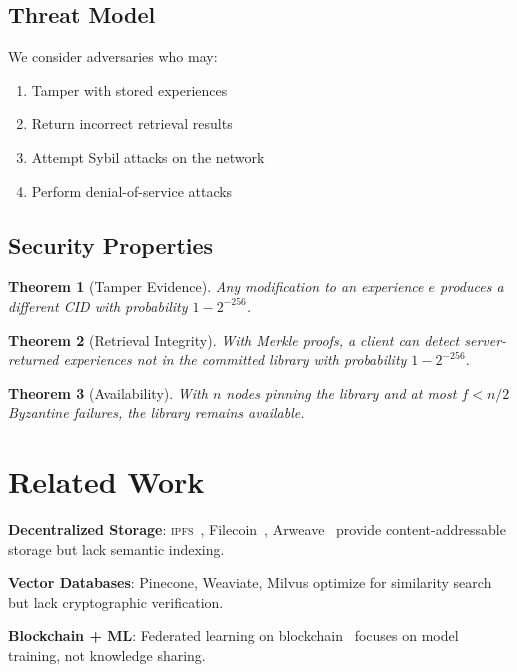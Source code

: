 \documentclass[11pt,letterpaper]{article}
\newtheorem{theorem}{Theorem}[section]
\newcommand{\IPFS}{\textsc{ipfs}}
\begin{document}
\subsection{Threat Model}

We consider adversaries who may:
\begin{enumerate}
    \item Tamper with stored experiences
    \item Return incorrect retrieval results
    \item Attempt Sybil attacks on the network
    \item Perform denial-of-service attacks
\end{enumerate}

\subsection{Security Properties}

\begin{theorem}[Tamper Evidence]
Any modification to an experience $e$ produces a different CID with probability $1 - 2^{-256}$.
\end{theorem}

\begin{theorem}[Retrieval Integrity]
With Merkle proofs, a client can detect server-returned experiences not in the committed library with probability $1 - 2^{-256}$.
\end{theorem}

\begin{theorem}[Availability]
With $n$ nodes pinning the library and at most $f < n/2$ Byzantine failures, the library remains available.
\end{theorem}

\section{Related Work}

\textbf{Decentralized Storage}: \IPFS{}~\cite{benet2014ipfs}, Filecoin~\cite{protocol2017filecoin}, Arweave~\cite{williams2019arweave} provide content-addressable storage but lack semantic indexing.

\textbf{Vector Databases}: Pinecone, Weaviate, Milvus optimize for similarity search but lack cryptographic verification.

\textbf{Blockchain + ML}: Federated learning on blockchain~\cite{kurtulmus2018trustless} focuses on model training, not knowledge sharing.
\end{document}
